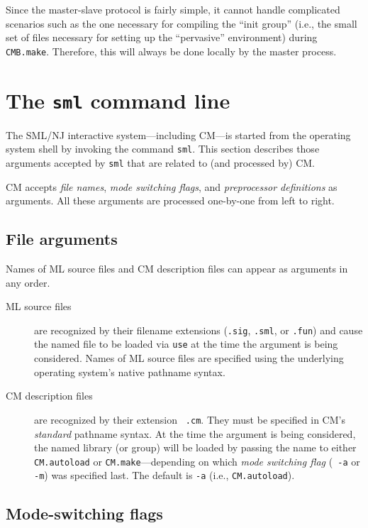 \documentclass[titlepage,letterpaper]{article}
\begin{document}
Since the master-slave protocol is fairly simple, it cannot handle
complicated scenarios such as the one necessary for compiling the
``init group'' (i.e., the small set of files necessary for setting up
the ``pervasive'' environment) during {\tt CMB.make}.  Therefore, this
will always be done locally by the master process.

\section{The {\tt sml} command line}

The SML/NJ interactive system---including CM---is started from the
operating system shell by invoking the command {\tt sml}.
This section describes those arguments accepted by {\tt sml} that
are related to (and processed by) CM.

CM accepts {\em file names}, {\em mode switching flags}, and {\em
preprocessor definitions} as arguments.  All these arguments are
processed one-by-one from left to right.

\subsection{File arguments}

Names of ML source files and CM description files can appear as
arguments in any order.

\begin{description}
\item[ML source files] are recognized by their filename extensions
({\tt .sig}, {\tt .sml}, or {\tt .fun}) and cause the named file to be
loaded via {\tt use} at the time the argument is being considered.
Names of ML source files are specified using the underlying operating
system's native pathname syntax.
\item[CM description files] are recognized by their extension {\tt
.cm}.  They must be specified in CM's {\em standard} pathname syntax.
At the time the argument is being considered, the named library (or
group) will be loaded by passing the name to either {\tt CM.autoload}
or {\tt CM.make}---depending on which {\em mode switching flag} ({\tt
-a} or {\tt -m}) was specified last.  The default is {\tt -a} (i.e.,
{\tt CM.autoload}).
\end{description}

\subsection{Mode-switching flags}
\end{document}
